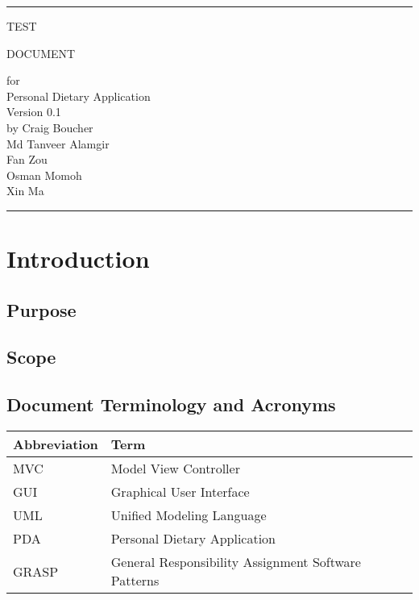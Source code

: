 \documentclass{scrreprt}
\date{}
\def\myversion{0.1}
\begin{document}
\begin{titlepage}
  \flushright\bfseries\huge
    \rule{\linewidth}{5pt}
    \par
    \vspace{1cm}
    {\Huge TEST \par DOCUMENT \par}
    \vspace{2cm}
    for \\
    \vspace{2cm}
    Personal Dietary Application \\
    \vspace{2cm}
     \LARGE{Version \myversion \\}
    \vspace{2cm}
    by Craig Boucher \\
    Md Tanveer Alamgir \\
    Fan Zou\\
    Osman Momoh \\
    Xin Ma
    \vspace{2cm}
    \rule{\linewidth}{5pt}
\end{titlepage}

\tableofcontents

\chapter{Introduction}

\section{Purpose}

\section{Scope}

\section{Document Terminology and Acronyms}

\begin{tabular}{|l|l|}
\hline
	\textbf{Abbreviation} & \textbf{Term} \\
\hline
	MVC & Model View Controller \\
\hline
	GUI & Graphical User Interface \\
\hline
	UML & Unified Modeling Language \\
\hline
	PDA & Personal Dietary Application \\
\hline
	GRASP & General Responsibility Assignment Software Patterns \\
\hline
\end{tabular}
\end{document}
